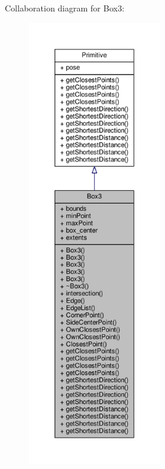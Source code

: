 Collaboration diagram for Box3\+:
\nopagebreak
\begin{figure}[H]
\begin{center}
\leavevmode
\includegraphics[height=550pt]{class_box3__coll__graph}
\end{center}
\end{figure}
